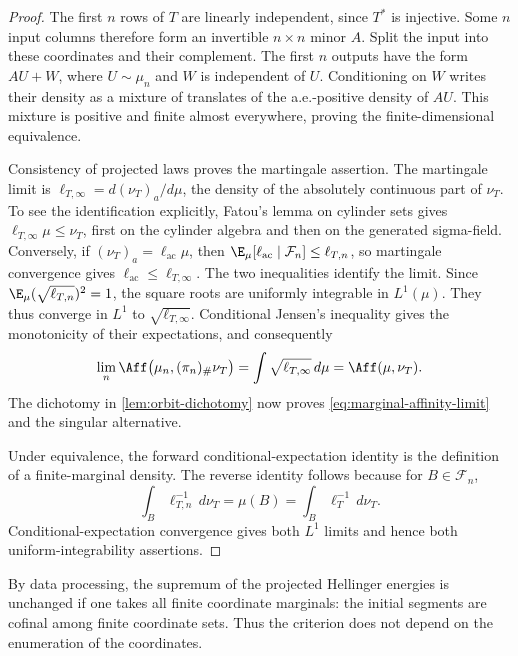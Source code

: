 \begin{proof}
The first \(n\) rows of \(T\) are linearly independent, since \(T^*\)
is injective.  Some \(n\) input columns therefore form an invertible
\(n\times n\) minor \(A\).  Split the input into these coordinates
and their complement.  The first \(n\) outputs have the form
\(AU+W\), where \(U\sim\mu_n\) and \(W\) is independent of \(U\).
Conditioning on \(W\) writes their density as a mixture of translates
of the a.e.-positive density of \(AU\).  This mixture is positive
and finite almost everywhere, proving the finite-dimensional equivalence.

Consistency of projected laws proves the martingale assertion.  The
martingale limit is
\(\ell_{T,\infty}=d(\nu_T)_a/d\mu\), the density of the absolutely continuous
part of \(\nu_T\).  To see the identification explicitly, Fatou's lemma
on cylinder sets gives \(\ell_{T,\infty}\mu\leq\nu_T\), first on the cylinder
algebra and then on the generated sigma-field.  Conversely, if
\((\nu_T)_a=\ell_{\mathrm{ac}}\mu\), then
\(\E_\mu[\ell_{\mathrm{ac}}\mid\mathcal F_n]\leq \ell_{T,n}\), so martingale
convergence gives \(\ell_{\mathrm{ac}}\leq \ell_{T,\infty}\).  The two inequalities identify
the limit.
Since \(\E_\mu(\sqrt{\ell_{T,n}})^2=1\), the square roots are uniformly
integrable in \(L^1(\mu)\).  They thus converge in \(L^1\) to
\(\sqrt{\ell_{T,\infty}}\).  Conditional Jensen's inequality gives the
monotonicity of their expectations, and consequently
\[
  \lim_n\Aff\bigl(\mu_n,(\pi_n)_\#\nu_T\bigr)
      =\int\sqrt{\ell_{T,\infty}}\,d\mu
      =\Aff(\mu,\nu_T).
\]
The dichotomy in \cref{lem:orbit-dichotomy} now proves
\eqref{eq:marginal-affinity-limit} and the singular alternative.

Under equivalence, the forward conditional-expectation identity is the
definition of a finite-marginal density.  The reverse identity follows because
for \(B\in\mathcal F_n\),
\[
  \int_B \ell_{T,n}^{-1}\,d\nu_T=\mu(B)
       =\int_B \ell_T^{-1}\,d\nu_T.
\]
Conditional-expectation convergence gives both \(L^1\) limits and hence
both uniform-integrability assertions.
\end{proof}

By data processing, the supremum of the projected Hellinger energies is
unchanged if one takes all finite coordinate marginals: the initial
segments are cofinal among finite coordinate sets.  Thus the criterion
does not depend on the enumeration of the coordinates.

